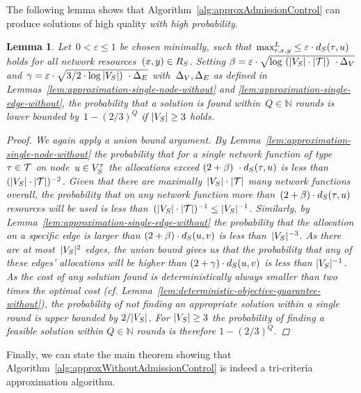 \documentclass[10pt, conference, letterpaper]{IEEEtran}
\newtheorem{lemma}[theorem]{Lemma}
\begin{document}
The following lemma shows that Algorithm~\ref{alg:approxAdmissionControl} can produce solutions of high quality \emph{with high probability}.

\begin{lemma}
Let~$0 < \varepsilon \leq 1$ be chosen minimally, such that~$\maxLoadV[\req][x][y] \leq \varepsilon \cdot \Scap(\type,u)$ holds for all network resources~$(x,y) \in  R_{S}$.  Setting $\beta = \varepsilon \cdot \sqrt{\log~(|V_S|\cdot|\mathcal{T}|)~\cdot \Delta_V  }$ and~$\gamma = \varepsilon \cdot \sqrt{3/2\cdot \log |V_S|)~\cdot \Delta_E  }$ with~$\Delta_V,\Delta_E$ as defined in Lemmas~\ref{lem:approximation-single-node-without} and \ref{lem:approximation-single-edge-without}, the probability that a solution is found within~$Q \in \mathbb{N}$ rounds is lower bounded by~$1 -(2/3)^Q$ if $|V_S| \geq 3$ holds.
\begin{proof}
We again apply a union bound argument. By Lemma~\ref{lem:approximation-single-node-without} the probability that for a single network function of type~$\tau \in \mathcal{T}$ on node~$u \in V^{\tau}_{S}$ the allocations exceed $(2+\beta)~\cdot d_{S}(\tau,u)$ is less than~$(|V_S| \cdot |\mathcal{T}|)^{-2}$. Given that there are maximally~$|V_S| \cdot |\mathcal{T}|$ many network functions overall, the probability that on any network function more than~$(2+\beta)\cdot d_{S}(\tau,u)$ resources will be used is less than~$(|V_S| \cdot |\mathcal{T}|)^{-1} \leq |V_S|^{-1}$. Similarly, by Lemma~\ref{lem:approximation-single-edge-without} the probability that the allocation on a specific edge is larger than $(2+\beta)\cdot d_{S}(u,v)$ is less than~$|V_S|^{-3}$. As there are at most~$|V_S|^2$ edges, the union bound gives us that the probability that any of these edges' allocations will be higher than $(2+\gamma)\cdot d_{S}(u,v)$ is less than $|V_S|^{-1}$. As the cost of any solution found is deterministically always smaller than two times the optimal cost (cf. Lemma~\ref{lem:deterministic-objective-guarantee-without}), the probability of \emph{not} finding an appropriate solution within a single round is upper bounded by $2/|V_S|$. For $|V_S| \geq 3$ the probability of finding a feasible solution within $Q \in \mathbb{N}$ rounds is therefore $1-(2/3)^Q$.
\end{proof}
\end{lemma}

Finally, we can state the main theorem showing that Algorithm~\ref{alg:approxWithoutAdmissionControl} is indeed a tri-criteria approximation algorithm.
\end{document}
